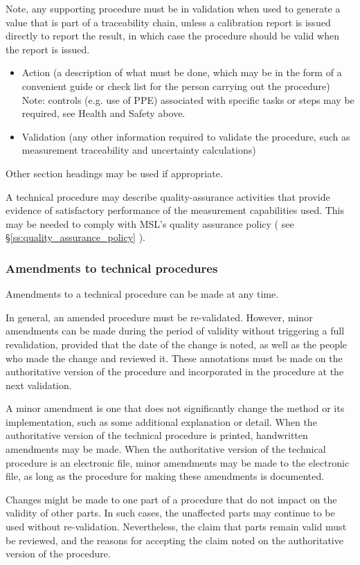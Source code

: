 Note, any supporting procedure must be in validation when used to generate a value that is part of a traceability chain, unless a calibration report is issued directly to report the result, in which case the procedure should be valid when the report is issued. 

\begin{itemize}
\item Action (a description of what must be done, which may be in the form of a convenient guide or check list for the person carrying out the procedure) Note: controls (e.g. use of PPE) associated with specific tasks or steps may be required, see Health and Safety above.
\item Validation (any other information required to validate the procedure, such as measurement traceability and uncertainty calculations)
\end{itemize}

Other section headings may be used if appropriate.

A technical procedure may describe quality-assurance activities that provide evidence of satisfactory performance of the measurement capabilities used.  This may be needed to comply with MSL's quality assurance policy ( see \S\ref{ss:quality_assurance_policy} ).

\subsubsection{Amendments to technical procedures}
Amendments to a technical procedure can be made at any time. 

In general, an amended procedure must be re-validated. However, minor amendments can be made during the period of validity without triggering a full revalidation, provided that the date of the change is noted, as well as the people who made the change and reviewed it. These annotations must be made on the authoritative version of the procedure and incorporated in the procedure at the next validation.

A minor amendment is one that does not significantly change the method or its implementation, such as some additional explanation or detail.  When the authoritative version of the technical procedure is printed, handwritten amendments may be made.  When the authoritative version of the technical procedure is an electronic file, minor amendments may be made to the electronic file, as long as the procedure for making these amendments is documented.

Changes might be made to one part of a procedure that do not impact on the validity of other parts. In such cases, the unaffected parts may continue to be used without re-validation. Nevertheless, the claim that parts remain valid must be reviewed, and the reasons for accepting the claim noted on the authoritative version of the procedure.

